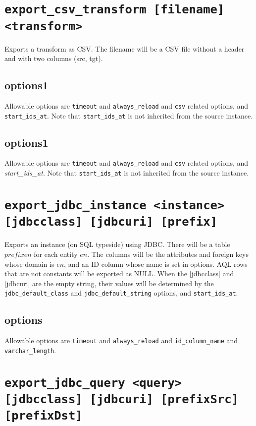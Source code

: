 \documentclass[10pt]{book}
\begin{document}
\section{{\tt export\_csv\_transform [filename] <transform>}}

Exports a transform as CSV.  The filename will be a CSV file without a header and with two columns (src, tgt).  

\subsection{options1}
Allowable options are {\tt timeout} and {\tt always\_reload}  and {\tt csv} related options, and {\tt start\_ids\_at}.  Note that {\tt start\_ids\_at} is not inherited from the source instance.

\subsection{options1}
Allowable options are {\tt timeout} and {\tt always\_reload}  and {\tt csv} related options, and {\it start\_ids\_at}.  Note that {\tt start\_ids\_at} is not inherited from the source instance.

\section{{\tt export\_jdbc\_instance <instance> [jdbcclass] [jdbcuri] [prefix] }}

Exports an instance (on SQL typeside) using JDBC.  There will be a table $prefixen$ for each entity $en$.  The columns will be the attributes and foreign keys whose domain is $en$, and an ID column whose name is set in options.  AQL rows that are not constants will be exported as NULL.  When the [jdbcclass] and [jdbcuri] are the empty string, their values will be determined by the {\tt jdbc\_default\_class} and {\tt jdbc\_default\_string} options, and {\tt start\_ids\_at}.

\subsection{options}
Allowable options are {\tt timeout}  and {\tt always\_reload} and  {\tt id\_column\_name} and {\tt varchar\_length}.

\section{{\tt export\_jdbc\_query <query> [jdbcclass] [jdbcuri] [prefixSrc] [prefixDst] }}
\end{document}
